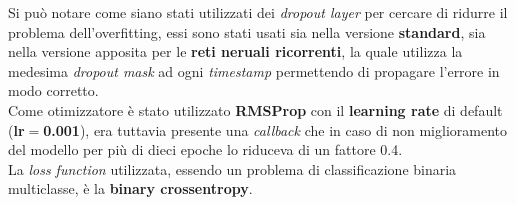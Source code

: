 Si può notare come siano stati utilizzati dei \textit{dropout layer} per cercare di ridurre il problema dell'overfitting, essi sono stati usati sia nella versione \textbf{standard}, sia nella versione apposita per le \textbf{reti neruali ricorrenti}, la quale utilizza la medesima \textit{dropout mask} ad ogni \textit{timestamp} permettendo di propagare l'errore in modo corretto. \cite{DeepLearningPython}
\\Come otimizzatore è stato utilizzato \textbf{RMSProp} con il \textbf{learning rate} di default (\textbf{lr$=$0.001}), era tuttavia presente una \textit{callback} che in caso di non miglioramento del modello per più di dieci epoche lo riduceva di un fattore 0.4.
\\La \textit{loss function} utilizzata, essendo un problema di classificazione binaria multiclasse, è la \textbf{binary crossentropy}.